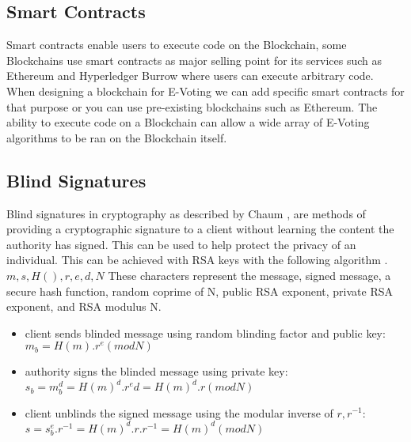 \documentclass{entcs}
\begin{document}
\subsection{Smart Contracts}
Smart contracts enable users to execute code on the Blockchain, some Blockchains use smart contracts as major selling point for its services such as Ethereum \cite{wood2014ethereum} and Hyperledger Burrow \cite{HyperLedgerBurrow} where users can execute arbitrary code. When designing a blockchain for E-Voting we can add specific smart contracts for that purpose or you can use pre-existing blockchains such as Ethereum. The ability to execute code on a Blockchain can allow a wide array of E-Voting algorithms to be ran on the Blockchain itself.

\subsection{Blind Signatures}
Blind signatures in cryptography as described by Chaum \cite{chaum1983blind}, are methods of providing a cryptographic signature to a client without learning the content the authority has signed. This can be used to help protect the privacy of an individual. This can be achieved with RSA keys with the following algorithm \cite{MITcrypto}.
\(m, s, H(), r, e, d, N\) These characters represent the message, signed message, a secure hash function, random coprime of N, public RSA exponent, private RSA exponent, and RSA modulus N.
\begin{itemize}
    \item client sends blinded message using random blinding factor and public key: \\
    \(m_b = H(m).r^e (mod N)\)
    \item authority signs the blinded message using private key: \\
    \(s_b = m^d_b = H(m)^d.r^ed = H(m)^d.r (mod N)\)
    \item client unblinds the signed message using the modular inverse of \(r, r^{-1}\): \\
    \(s = s^e_b.r^{-1} = H(m)^d.r.r^{-1} = H(m)^d (mod N)\)
\end{itemize}
\end{document}

